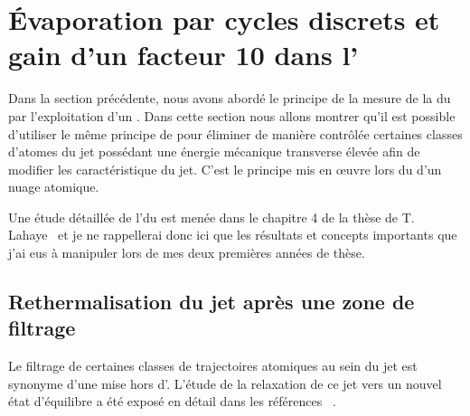 \section{Évaporation par cycles discrets et gain d'un facteur 10 dans l'\edpup}\label{sec:EvapRf}

Dans la section précédente, nous avons abordé le principe de la mesure de la \tempt du \jat par l'exploitation d'un \spfirf. 
Dans cette section nous allons montrer qu'il est possible d'utiliser le même principe de \fispse pour éliminer de manière contrôlée certaines classes d'atomes du jet possédant une énergie mécanique transverse élevée afin de modifier les caractéristique du jet. C'est le principe mis en \oe uvre lors du \rpef d'un nuage atomique.%

Une étude détaillée de l'\evap du \jat est menée dans le chapitre 4 de la thèse de T. Lahaye~\cite{TTL} et je ne rappellerai donc ici que les résultats et concepts importants que j'ai eus à manipuler lors de mes deux premières années de thèse.



\casse


\subsection{Rethermalisation du jet après une zone de filtrage \rf}\label{sec:RethermJet}
Le filtrage de certaines classes de trajectoires atomiques au sein du jet est synonyme d'une mise hors d'\eqthdy.	
L'étude de la relaxation de ce jet  vers un nouvel état d'équilibre a été exposé en détail dans les références~\cite{TTL,LaG05}%
.

